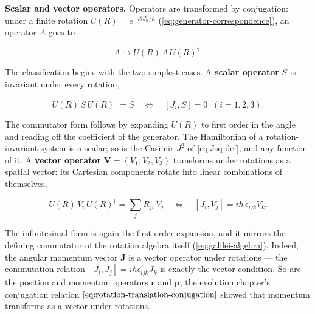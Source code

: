 \medskip\noindent\textbf{Scalar and vector operators.} Operators are transformed by conjugation: under a finite rotation $U(R) = e^{-i\theta J_n/\hbar}$ (\eqref{eq:generator-correspondence}), an operator $A$ goes to
\begin{linenomath}
\begin{equation*}
A \mapsto U(R)\,A\,U(R)^\dagger .
\end{equation*}
\end{linenomath}
The classification begins with the two simplest cases. A \textbf{scalar operator} $S$ is invariant under every rotation,
\begin{linenomath}
\begin{equation*}
U(R)\,S\,U(R)^\dagger = S \quad\Longleftrightarrow\quad [J_i, S] = 0 \;\; (i=1,2,3) .
\end{equation*}
\end{linenomath}
The commutator form follows by expanding $U(R)$ to first order in the angle and reading off the coefficient of the generator. The Hamiltonian of a rotation-invariant system is a scalar; so is the Casimir $J^2$ of \eqref{eq:Jsq-def}, and any function of it. A \textbf{vector operator} $\bm V = (V_1,V_2,V_3)$ transforms under rotations as a spatial vector: its Cartesian components rotate into linear combinations of themselves,
\begin{linenomath}
\begin{equation*}
U(R)\,V_i\,U(R)^\dagger = \sum_{j} R_{ji}\,V_j
\quad\Longleftrightarrow\quad
[J_i, V_j] = i\hbar\,\epsilon_{ijk}V_k .
\end{equation*}
\end{linenomath}
The infinitesimal form is again the first-order expansion, and it mirrors the defining commutator of the rotation algebra itself (\eqref{eq:galilei-algebra}). Indeed, the angular momentum vector $\bm J$ is a vector operator under rotations --- the commutation relation $[J_i, J_j] = i\hbar\epsilon_{ijk}J_k$ is exactly the vector condition. So are the position and momentum operators $\bm r$ and $\bm p$; the evolution chapter's conjugation relation $\eqref{eq:rotation-translation-conjugation}$ showed that momentum transforms as a vector under rotations.


